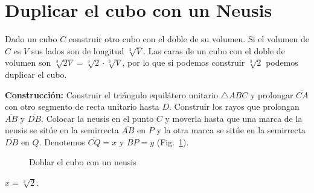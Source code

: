 \section{Duplicar el cubo con un Neusis}\label{s.neusis-doubling}

Dado un cubo $C$ construir otro cubo con el doble de su volumen. Si el volumen de $C$ es $V$ sus lados son de longitud $\sqrt[3]{V}$. Las caras de un cubo con el doble de volumen son $\sqrt[3]{2 V}=\sqrt[3]{2}\cdot\sqrt[3]{V}$, por lo que si podemos construir $\sqrt[3]{2}$ podemos duplicar el cubo.

\noindent\textbf{Construcción:}
Construir el triángulo equilátero unitario $\triangle ABC$ y prolongar $\overline{CA}$ con otro segmento de recta unitario hasta $D$. Construir los rayos que prolongan $\overline{AB}$ y $\overline{DB}$. Colocar la neusis en el punto $C$ y moverla hasta que una marca de la neusis se sitúe en la semirrecta $\overline{AB}$ en $P$ y la otra marca se sitúe en la semirrecta $\overline{DB}$ en $Q$. Denotemos $\overline{CQ}=x$ y $\overline{BP}=y$ (Fig.~\ref{f.double-neusis}).

\begin{figure}[b]
\begin{center}
\end{center}
\caption{Doblar el cubo con un neusis}\label{f.double-neusis}
\end{figure}

\begin{theorem}
$x=\sqrt[3]{2}$.
\end{theorem}

